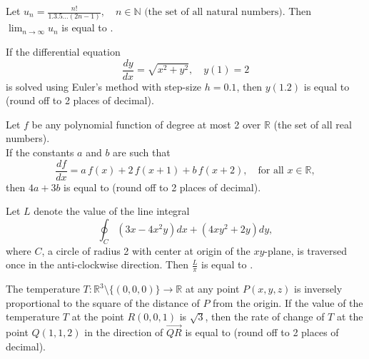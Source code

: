 \iffalse
\chapter{2019}
\section{ma}
\author{EE24BTECH11030}
\fi
\item  Let
$
u_n = \frac{n!}{1.3.5\ldots (2n-1)}, \quad n \in \mathbb{N} \text{ (the set of all natural numbers)}.
$
Then $\lim_{n \to \infty} u_n$ is equal to \underline{\hspace{2cm}}.

\bigskip

\item  If the differential equation
\[
\frac{dy}{dx} = \sqrt{x^2 + y^2}, \quad y(1) = 2
\]
is solved using Euler's method with step-size $h = 0.1$, then $y(1.2)$ is equal to \underline{\hspace{2cm}} (round off to 2 places of decimal).

\bigskip

\item  Let $f$ be any polynomial function of degree at most 2 over $\mathbb{R}$ (the set of all real numbers).\\
If the constants $a$ and $b$ are such that
\[
\frac{df}{dx} = a \, f(x) + 2 \, f(x+1) + b \, f(x+2), \quad \text{for all } x \in \mathbb{R},
\]
then $4a + 3b$ is equal to \underline{\hspace{2cm}} (round off to 2 places of decimal).

\bigskip

\item  Let $L$ denote the value of the line integral
\[
\oint_C \left(3x - 4x^2y\right) dx + \left(4xy^2 + 2y\right) dy,
\]
where $C$, a circle of radius 2 with center at origin of the $xy$-plane, is traversed once in the anti-clockwise direction. Then $\frac{L}{\pi}$ is equal to \underline{\hspace{2cm}}.

\bigskip

\item  The temperature $T : \mathbb{R}^3 \setminus \{(0, 0, 0)\} \rightarrow \mathbb{R}$ at any point $P(x, y, z)$ is inversely proportional to the square of the distance of $P$ from the origin. If the value of the temperature $T$ at the point $R(0, 0, 1)$ is $\sqrt{3}$, then the rate of change of $T$ at the point $Q(1, 1, 2)$ in the direction of $\overrightarrow{QR}$ is equal to \underline{\hspace{2cm}} (round off to 2 places of decimal).

